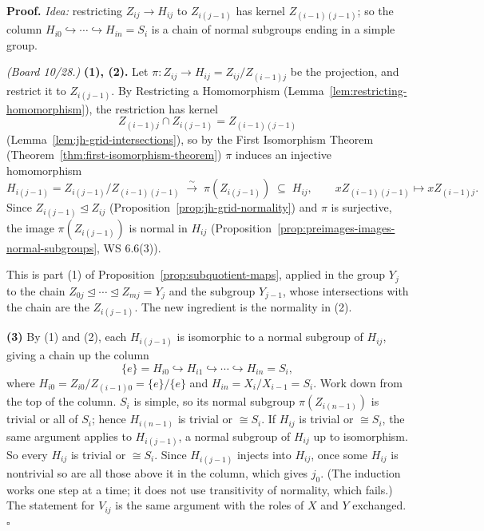 \documentclass[11pt]{report}
\renewenvironment{proof}[1][Proof]{\noindent\textbf{#1.} }{\hfill$\square$\par\vspace{5pt}}
\begin{document}
\begin{proof}
\textit{Idea:} restricting $Z_{ij} \to H_{ij}$ to $Z_{i(j-1)}$ has kernel $Z_{(i-1)(j-1)}$; so the column $H_{i0} \hookrightarrow \cdots \hookrightarrow H_{in} = S_i$ is a chain of normal subgroups ending in a simple group.\par
\textit{(Board 10/28.)} \textbf{(1), (2).} Let $\pi: Z_{ij} \to H_{ij} = Z_{ij}/Z_{(i-1)j}$ be the projection, and restrict it to $Z_{i(j-1)}$. By Restricting a Homomorphism (Lemma~\ref{lem:restricting-homomorphism}), the restriction has kernel
\[ Z_{(i-1)j} \cap Z_{i(j-1)} = Z_{(i-1)(j-1)} \]
(Lemma~\ref{lem:jh-grid-intersections}), so by the First Isomorphism Theorem (Theorem~\ref{thm:first-isomorphism-theorem}) $\pi$ induces an injective homomorphism
\[ H_{i(j-1)} = Z_{i(j-1)}/Z_{(i-1)(j-1)} \;\xrightarrow{\ \sim\ }\; \pi(Z_{i(j-1)}) \;\subseteq\; H_{ij}, \qquad x Z_{(i-1)(j-1)} \mapsto x Z_{(i-1)j}. \]
Since $Z_{i(j-1)} \trianglelefteq Z_{ij}$ (Proposition~\ref{prop:jh-grid-normality}) and $\pi$ is surjective, the image $\pi(Z_{i(j-1)})$ is normal in $H_{ij}$ (Proposition~\ref{prop:preimages-images-normal-subgroups}, WS 6.6(3)).

This is part (1) of Proposition~\ref{prop:subquotient-maps}, applied in the group $Y_j$ to the chain $Z_{0j} \trianglelefteq \cdots \trianglelefteq Z_{mj} = Y_j$ and the subgroup $Y_{j-1}$, whose intersections with the chain are the $Z_{i(j-1)}$. The new ingredient is the normality in (2).

\textbf{(3)} By (1) and (2), each $H_{i(j-1)}$ is isomorphic to a normal subgroup of $H_{ij}$, giving a chain up the column
\[ \{e\} = H_{i0} \hookrightarrow H_{i1} \hookrightarrow \cdots \hookrightarrow H_{in} = S_i, \]
where $H_{i0} = Z_{i0}/Z_{(i-1)0} = \{e\}/\{e\}$ and $H_{in} = X_i/X_{i-1} = S_i$. Work down from the top of the column. $S_i$ is simple, so its normal subgroup $\pi(Z_{i(n-1)})$ is trivial or all of $S_i$; hence $H_{i(n-1)}$ is trivial or $\cong S_i$. If $H_{ij}$ is trivial or $\cong S_i$, the same argument applies to $H_{i(j-1)}$, a normal subgroup of $H_{ij}$ up to isomorphism. So every $H_{ij}$ is trivial or $\cong S_i$. Since $H_{i(j-1)}$ injects into $H_{ij}$, once some $H_{ij}$ is nontrivial so are all those above it in the column, which gives $j_0$. (The induction works one step at a time; it does not use transitivity of normality, which fails.) The statement for $V_{ij}$ is the same argument with the roles of $X$ and $Y$ exchanged.
\end{proof}
\end{document}
